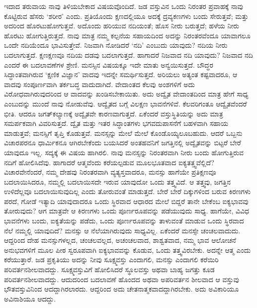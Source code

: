 ಇದಾದ ತರುವಾಯ ನಾವು ತಿಳಿಯಬೇಕಾದ ವಿಷಯವೊಂದಿದೆ. ಜಡ ವಸ್ತುವಿನ ಒಂದು ನಿರಂತರ ಪ್ರವಾಹಕ್ಕೆ ನಾವು ಕೊಟ್ಟಿರುವ ಹೆಸರು ‘ಶರೀರ’ ಎಂದು. ಪ್ರತಿಯೊಂದು ಕ್ಷಣದಲ್ಲಿಯೂ ಅದಕ್ಕೆ ದ್ರವ್ಯಕಣಗಳು ಬಂದು ಸೇರುತ್ತವೆ; ಮತ್ತು ಅದರಿಂದ ಹೊರಟುಹೋಗುತ್ತವೆ. ಅದೊಂದು ಹರಿಯುವ ನದಿಯಂತೆ; ಹೊಸ ನೀರು ಬರುತ್ತದೆ; ಹಳೆಯ ನೀರು ಹೊರಟು ಹೋಗುತ್ತಿರುತ್ತದೆ. ನಾವು ಮಾತ್ರ ನಮ್ಮ ಕಲ್ಪನೆಯ ಸಹಾಯದಿಂದ ಅದನ್ನು ನಿರಂತರವೆಂದೂ ಯಾವಾಗಲೂ ಒಂದೇ ನದಿಯೆಂದೂ ಭಾವಿಸುತ್ತೇವೆ. ನಿಜವಾಗಿ ನೋಡಿದರೆ ‘ನದಿ’ ಎಂಬುದು ಯಾವುದು? ನದಿಯ ನೀರು ಬದಲಾಗುತ್ತದೆ. ಕ್ಷಣಕ್ಷಣವೂ ನದಿಯ ದಡವು ಬದಲಾಗುತ್ತದೆ. ಹಾಗಾದರೆ ನಿಜವಾದ ನದಿ ಯಾವುದು? ನಿಜವಾದ ನದಿ ಎಂದರೆ ಈ ಬದಲಾವಣೆಗಳ ಶ್ರೇಣಿ. ಮನಸ್ಸಿನ ವಿಷಯಕ್ಕೂ ಇದೇ ಮಾತು ಅನ್ವಯಿಸುತ್ತದೆ. ಬೌದ್ಧರ ಸಿದ್ಧಾಂತವಾಗಿರುವ ‘ಕ್ಷಣಿಕ ವಿಜ್ಞಾನ’ ವಾದವು ಇದನ್ನೇ ಸಮರ್ಥಿಸುತ್ತದೆ. ಅರಿಯಲು ಅತ್ಯಂತ ಕಷ್ಟವಾದರೂ, ಆ ವಾದವು ಸಂಪೂರ್ಣವಾಗಿ ತರ್ಕಬದ್ಧ ವಾದುದಾಗಿದೆ. ವೇದಾಂತದ ಕೆಲವು ಅಂಶಗಳಿಗೆ ಅದು ವಿರೋಧವಾಗಿರುವುದರಿಂದ ಆ ವಾದವನ್ನು ಖಂಡಿಸಬೇಕಾಯಿತು. ಅದು ಅದ್ವೈತ ವೇದಾಂತದಿಂದ ಮಾತ್ರ ಹೇಗೆ ಸಾಧ್ಯ ಎಂಬುದನ್ನು ಮುಂದೆ ನಾವು ನೋಡುವೆವು. ಆದ್ವೈತದ ಬಗ್ಗೆ ವಿಲಕ್ಷಣ ಭಾವನೆಗಳಿವೆ. ಕೆಲವರಿಗಂತೂ ಆದ್ವೈತವೆಂದರೆ ಭೀತಿ. ಆದರೂ ಜಗತ್​ ಕಲ್ಯಾಣಕ್ಕೆ ಅದ್ವೈತವೇ ಕಾರಣವಾಗುತ್ತದೆ. ಏಕೆಂದರೆ ವಸ್ತುಸ್ಥಿತಿಯನ್ನು ಅದು ಮಾತ್ರ ಸಮರ್ಪಕವಾಗಿ ವಿವರಿಸುತ್ತದೆ. ದ್ವೈತ ಮತ್ತು ಇತರ ಸಿದ್ಧಾಂತಗಳು ಭಗವದುಪಾಸನೆಗೆ ಬಹಳವಾಗಿ ಸಹಾಯ ಮಾಡುತ್ತವೆ; ಮನಸ್ಸಿಗೆ ತೃಪ್ತಿ ಕೊಡುತ್ತವೆ. ಮನಸ್ಸನ್ನು ಮೇಲೆ ಮೇಲೆ ಕೊಂಡೊಯ್ಯಲೂಬಹುದು. ಆದರೆ ಒಬ್ಬನು ವಿಚಾರಪರನೂ ಧಾರ್ಮಿಕನೂ ಆಗಿರಬೇಕೆಂದು ಬಯಸಿದರೆ ಅಂತಹವನಿಗೆ ಜಗತ್ತಿನಲ್ಲಿ ಅದ್ವೈತವನ್ನು ಬಿಟ್ಟರೆ ಬೇರೆ ಯಾವುದೂ ಇಲ್ಲ. ಸದ್ಯಕ್ಕೆ ಈ ವಿಷಯ ಹಾಗಿರಲಿ. ನಾವು ಮನಸ್ಸನ್ನು ನಿರಂತರವಾಗಿ ನೀರು ಬಂದು ಹೋಗುತ್ತಿರುವ ನದಿಗೆ ಹೋಲಿಸಿದೆವು. ಹಾಗಾದರೆ ಆತ್ಮವೆಂದು ಕರೆಯಲ್ಪಡುವ ಮೂಲಭೂತವಾದ ಐಕ್ಯತತ್ತ್ವವೆಲ್ಲಿದೆ? ವಿಚಾರವೇನೆಂದರೆ, ನಮ್ಮ ದೇಹವು ನಿರಂತರವಾಗಿ ವ್ಯತ್ಯಸ್ತವಾದರೂ, ಮನಸ್ಸು ಹಾಗೆಯೇ ಪ್ರತಿಕ್ಷಣವೂ ಬದಲಾಯಿಸಿದರೂ, ನಮ್ಮಲ್ಲಿ ಬದಲಾಯಿಸದೇ ಇರುವ ಯಾವುದೋ ಒಂದು ತತ್ತ್ವವಿದೆ. ಆ ತತ್ತ್ವವು, ಜಗತ್ತಿನ ಉಳಿದೆಲ್ಲವೂ ಬದಲಾಯಿಸುವುದಿಲ್ಲ ಎಂದು ತೋರುವಂತೆ ಮಾಡುತ್ತದೆ. ಬೇರೆ ಬೇರೆ ದಿಕ್ಕುಗಳಿಂದ ಬರುವ ಕಿರಣಗಳು ಪರದೆ, ಗೋಡೆ ಇತ್ಯಾದಿ ಯಾವುದಾದರೂ ಒಂದು ಸ್ಥಿರವಾದ ಆಧಾರದ ಮೇಲೆ ಬಿದ್ದರೆ ತಾನೇ ಬೇಕೆಂಬ ಐಕ್ಯಭಾವವು ತೋರುವುದು? ಆಗ ಮಾತ್ರವೇ ಆ ಕಿರಣಗಳು ಒಂದು ಪೂರ್ಣರೂಪವನ್ನು ಪಡೆಯುವುದು ಸಾಧ್ಯ. ಹಾಗೆಯೇ, ವಿವಿಧ ಭಾವನೆಗಳು ಬಂದು, ಐಕ್ಯತೆಯನ್ನು ಪಡೆದು, ಒಂದು ಪೂರ್ಣರೂಪವನ್ನು ತಾಳುವಂತೆ ಮಾಡುವ ಒಂದು ಸ್ಥಿರವಾದ ನೆಲೆ ನಮ್ಮಲ್ಲಿ ಯಾವುದಿದೆ? ಮನಸ್ಸು ಆ ನೆಲೆಯಾಗಿರುವುದು ಸಾಧ್ಯವಿಲ್ಲ. ಏಕೆಂದರೆ ಮನಸ್ಸೇ ಚಂಚಲವಾದುದು. ಆದ್ದರಿಂದ ದೇಹ ಮನಸ್ಸುಗಳಲ್ಲದ, ಚಂಚಲವಲ್ಲದ, ಅಚಂಚಲವಾದ, ಶಾಶ್ವತವಾದ, ನಮ್ಮ ಭಾವ ಆಲೋಚನೆ ಅನುಭವಗಳಿಗೆ ಮೂಲ ಪೀಠ ಸ್ವರೂಪವಾಗಿ ಐಕ್ಯಭಾವವನ್ನು ಕೊಡುವ, ಒಂದು ತತ್ತ್ವವಿರಬೇಕು. ಅದನ್ನೇ ಆತ್ಮ ಎಂದು ಕರೆಯುತ್ತಾರೆ. ಜಡ ಪ್ರಕೃತಿಯು ಅದನ್ನು ನೀವು ಸೂಕ್ಷ್ಮವಸ್ತು ಎಂದಾಗಲಿ, ಮನಸ್ಸು ಎಂದಾಗಲಿ ಕರೆಯಿರಿ ಪರಿವರ್ತನಶೀಲವಾದದ್ದು. ಸೂಕ್ಷ್ಮವಸ್ತುವಿಗೆ ಹೋಲಿಸಿದರೆ ಸ್ಥೂಲವಸ್ತು ಅಥವಾ ಬಾಹ್ಯ ಜಗತ್ತು ಕೂಡ ಪರಿವರ್ತನಶೀಲವಾದದ್ದು. ಆದುದರಿಂದ ಬದಲಾವಣೆ ಹೊಂದದ ಅಥವಾ ಅಪರಿವರ್ತನ ಶೀಲವಾದ ಆ ವಸ್ತುವು ಭೌತವಸ್ತುವಿನಿಂದ ಆದದ್ದಾಗಿರಲಾರದು. ಆದ್ದರಿಂದ ಅದು ಚೇತನಾತ್ಮಕವಾದದ್ದಾಗಿರಬೇಕು. ಅದು ಅವಿಕಾರಿಯೂ ಅವಿನಾಶಿಯೂ ಆದದ್ದು.

